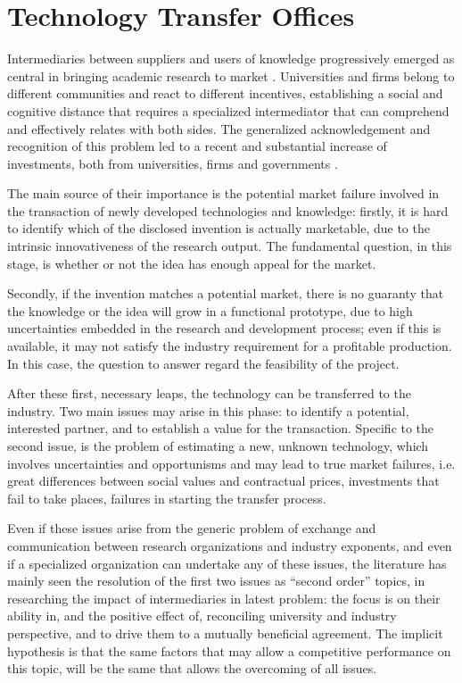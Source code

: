 \section{Technology Transfer Offices}

Intermediaries between suppliers and users of knowledge progressively emerged as central in bringing academic research to market \citep{Landry2013}. Universities and firms belong to different communities and react to different incentives, establishing a social and cognitive distance that requires a specialized intermediator that can comprehend and effectively relates with both sides. The generalized acknowledgement and recognition of this problem led to a recent and substantial increase of investments, both from universities, firms and governments \citep{Muscio2010}.

The main source of their importance is the potential market failure involved in the transaction of newly developed technologies and knowledge: firstly, it is hard to identify which of the disclosed invention is actually marketable, due to the intrinsic innovativeness of the research output. The fundamental question, in this stage, is whether or not the idea has enough appeal for the market.

Secondly, if the invention matches a potential market, there is no guaranty that the knowledge or the idea will grow in a functional prototype, due to high uncertainties embedded in the research and development process; even if this is available, it may not satisfy the industry requirement for a profitable production. In this case, the question to answer regard the feasibility of the project.

After these first, necessary leaps, the technology can be transferred to the industry. Two main issues may arise in this phase: to identify a potential, interested partner, and to establish a value for the transaction. Specific to the second issue, is the problem of estimating a new, unknown technology, which involves uncertainties and opportunisms and may lead to true market failures, i.e. great differences between social values and contractual prices, investments that fail to take places, failures in starting the transfer process.

Even if these issues arise from the generic problem of exchange and communication between research organizations and industry exponents, and even if a specialized organization can undertake any of these issues, the literature has mainly seen the resolution of the first two issues as \enquote{second order} topics, in researching the impact of intermediaries in latest problem: the focus is on their ability in, and the positive effect of, reconciling university and industry perspective, and to drive them to a mutually beneficial agreement. The implicit hypothesis is that the same factors that may allow a competitive performance on this topic, will be the same that allows the overcoming of all issues.


